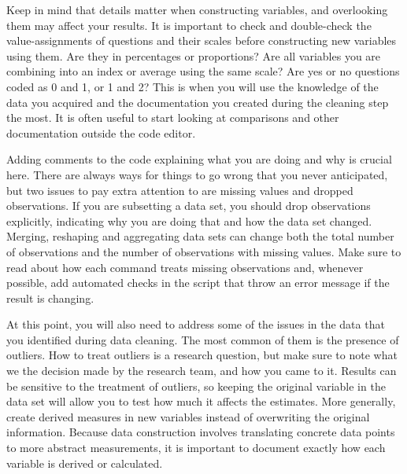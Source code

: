 Keep in mind that details matter when constructing variables, and overlooking them may affect your results. 
It is important to check and double-check the value-assignments of questions and their scales before constructing new variables using them.
Are they in percentages or proportions? 
Are all variables you are combining into an index or average using the same scale? 
Are yes or no questions coded as 0 and 1, or 1 and 2?
This is when you will use the knowledge of the data you acquired and the documentation you created during the cleaning step the most.
It is often useful to start looking at comparisons and other documentation 
outside the code editor.

Adding comments to the code explaining what you are doing and why is crucial here.
There are always ways for things to go wrong that you never anticipated, but two issues to pay extra attention to are missing values and dropped observations. 
If you are subsetting a data set, you should drop observations explicitly, indicating why you are doing that and how the data set changed.
Merging, reshaping and aggregating data sets can change both the total number of observations and the number of observations with missing values.
Make sure to read about how each command treats missing observations and, whenever possible, add automated checks in the script that throw an error message if the result is changing.

At this point, you will also need to address some of the issues in the data that you identified during data cleaning. 
The most common of them is the presence of outliers.
How to treat outliers is a research question, but make sure to note what we the decision made by the research team, and how you came to it. 
Results can be sensitive to the treatment of outliers, so keeping the original variable in the data set will allow you to test how much it affects the estimates.
More generally, create derived measures in new variables instead of overwriting the original information.
Because data construction involves translating concrete data points to more abstract measurements, it is important to document exactly how each variable is derived or calculated.



